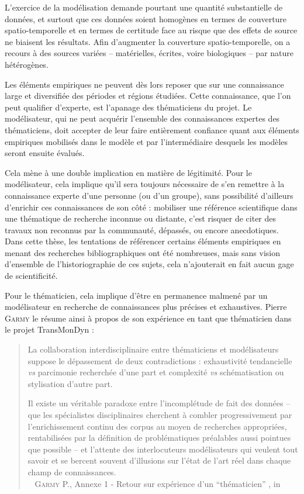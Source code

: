 L'exercice de la modélisation demande pourtant une quantité substantielle de données, et surtout que ces données soient homogènes en termes de couverture spatio-temporelle et en termes de certitude face au risque que des \og effets de source\fg{} ne biaisent les résultats.
Afin d'augmenter la couverture spatio-temporelle, on a recours à des sources variées -- matérielles, écrites, voire biologiques -- par nature hétérogènes.

Les éléments empiriques ne peuvent dès lors reposer que sur une connaissance large et diversifiée des périodes et régions étudiées.
Cette connaissance, que l'on peut qualifier d'experte, est l'apanage des \og thématiciens\fg{} du projet.
Le modélisateur, qui ne peut acquérir l'ensemble des connaissances expertes des thématiciens, doit accepter de leur faire entièrement confiance quant aux éléments empiriques mobilisés dans le modèle et par l'intermédiaire desquels les modèles seront ensuite évalués.

Cela mène à une double implication en matière de légitimité.
Pour le modélisateur, cela implique qu'il sera toujours nécessaire de s'en remettre à la connaissance experte d'une personne (ou d'un groupe), sans possibilité d'ailleurs d'enrichir ces connaissances de son côté :
	mobiliser une référence scientifique dans une thématique de recherche inconnue ou distante, c'est risquer de citer des travaux non reconnus par la communauté, dépassés, ou encore anecdotiques.
Dans cette thèse, les tentations de référencer certains éléments empiriques en menant des recherches bibliographiques ont été nombreuses, mais sans vision d'ensemble de l'historiographie de ces sujets, cela n'ajouterait en fait aucun gage de scientificité.

Pour le thématicien, cela implique d'être en permanence \og malmené\fg{} par un modélisateur en recherche de connaissances plus précises et exhaustives.
Pierre \textsc{Garmy} le résume ainsi à propos de son expérience en tant que thématicien dans le projet TransMonDyn :
\begin{quotation}
\noindent \og La collaboration interdisciplinaire entre thématiciens et modélisateurs suppose le dépassement de deux contradictions : exhaustivité tendancielle \textit{vs} parcimonie recherchée d'une part et complexité \textit{vs} schématisation ou stylisation d'autre part.

\noindent Il existe un véritable paradoxe entre l'incomplétude de fait des données -- que les spécialistes disciplinaires cherchent à combler progressivement par l'enrichissement continu des corpus au moyen de recherches appropriées, rentabilisées par la définition de problématiques préalables aussi pointues que possible -- et l'attente des interlocuteurs modélisateurs qui veulent tout savoir et se bercent souvent d'illusions sur l'état de l'art réel dans chaque champ de connaissances. \fg{} \\
\mbox{}~ \textsc{Garmy} P., \og Annexe 1 - Retour sur expérience d'un “thématicien” \fg{}, in \textcite[476]{ouriachi_lelaboration_2017}
\end{quotation}

